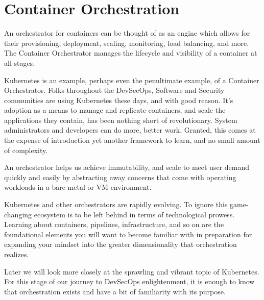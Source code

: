 \section{Container Orchestration}

\justify{}
An orchestrator for containers can be thought of as an engine which allows for their provisioning, deployment, scaling, monitoring, load
balancing, and more. The Container Orchestrator manages the lifecycle and visibility of a container at all stages.

\justify{}
Kubernetes is an example, perhaps even the penultimate example, of a Container Orchestrator.
Folks throughout the DevSecOps, Software and Security communities are using Kubernetes these days, and
with good reason. It's adoption as a means to manage and replicate containers, and scale the applications they contain,
has been nothing short of revolutionary. System administrators and developers can do more, better work. Granted, this comes at
the expense of introduction yet another framework to learn, and no small amount of complexity.

\justify{}
An orchestrator helps us achieve immutability, and scale to meet user demand quickly and easily by abstracting away
concerns that come with operating workloads in a bare metal or VM environment.

\justify{}
Kubernetes and other orchestrators are rapidly evolving. To ignore this game-changing ecosystem is to be left behind in terms of technological prowess. Learning about containers, pipelines, infrastructure, and
so on are the foundational elements you will want to become familiar with in preparation for expanding your mindset into the greater
dimensionality that orchestration realizes.

\justify{}
Later we will look more closely at the sprawling and vibrant topic of Kubernetes. For this stage of our journey to DevSecOps
enlightenment, it is enough to know that orchestration exists and have a bit of familiarity with its purpose.

